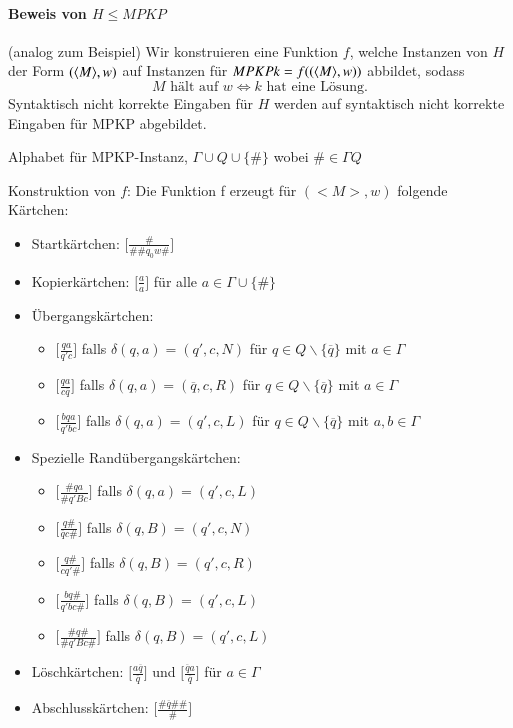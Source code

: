 \paragraph*{Beweis von $H \leq MPKP$} (analog zum Beispiel) Wir konstruieren eine Funktion $f$, welche Instanzen von $H$ der Form $(\langle M \rangle,w)$ auf Instanzen für $MPKP k=f((\langle M \rangle,w))$ abbildet, sodass $$ M \text{ hält auf } w \Leftrightarrow k \text{ hat eine Lösung.}$$ Syntaktisch nicht korrekte Eingaben für $H$ werden auf syntaktisch nicht korrekte Eingaben für MPKP abgebildet.

\par\medskip Alphabet für MPKP-Instanz, $\Gamma \cup Q \cup \{\#\}$ wobei $\#\in\Gamma Q$

\par\medskip Konstruktion von $f$: Die Funktion f erzeugt für $(<M>,w)$ folgende Kärtchen:

\begin{itemize}
	\item[] Startkärtchen: $\Big[ \frac{\#}{\#\#q_0 w\#} \Big]$
	\item[] Kopierkärtchen: $\Big[ \frac{a}{a} \Big]$ für alle $a \in \Gamma \cup \{\#\}$
	\item[] Übergangskärtchen: 
	\begin{itemize}
		\item[] $\Big[ \frac{qa}{q'c} \Big]$ falls $\delta(q,a)=(q',c,N)$ für $q \in Q\backslash\{\overline{q}\}$ mit $a \in \Gamma$
		\item[] $\Big[ \frac{qa}{c\overline{q}} \Big]$ falls $\delta(q,a)=(\overline{q},c,R)$ für $q \in Q\backslash\{\overline{q}\}$ mit $a \in \Gamma$
		\item[] $\Big[ \frac{bqa}{q'bc} \Big]$ falls $\delta(q,a)=(q',c,L)$ für $q \in Q\backslash\{\overline{q}\}$ mit $a,b \in \Gamma$
	\end{itemize}
	\item[] Spezielle Randübergangskärtchen:
	\begin{itemize}
		\item[] $\Big[ \frac{\#qa}{\#q'Bc} \Big]$ falls $\delta(q,a)=(q',c,L)$
		\item[] $\Big[ \frac{q\#}{\overline{q}c\#} \Big]$ falls $\delta(q,B)=(q',c,N)$
		\item[] $\Big[ \frac{q\#}{cq'\#} \Big]$ falls $\delta(q,B)=(q',c,R)$
		\item[] $\Big[ \frac{bq\#}{q'bc\#} \Big]$ falls $\delta(q,B)=(q',c,L)$
		\item[] $\Big[ \frac{\#q\#}{\#q'Bc\#} \Big]$ falls $\delta(q,B)=(q',c,L)$
	\end{itemize}
	\item[] Löschkärtchen: $\Big[ \frac{a\overline{q}}{\overline{q}} \Big]$ und $\Big[ \frac{\overline{q}a}{\overline{q}} \Big]$ für $a \in \Gamma$
	\item[] Abschlusskärtchen: $\Big[ \frac{\#\overline{q}\#\#}{\#} \Big]$
\end{itemize}

